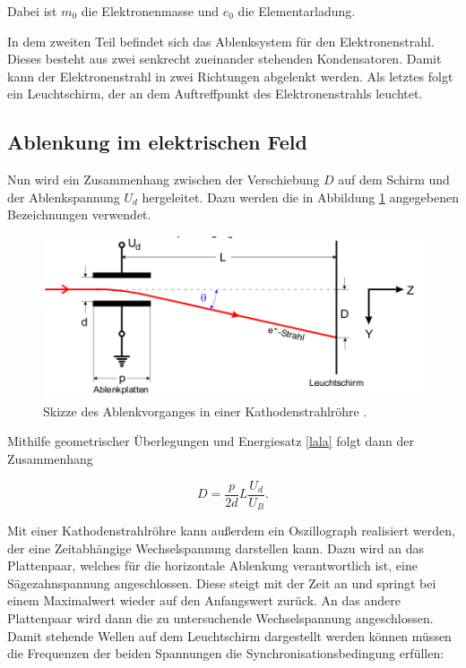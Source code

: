 Dabei ist $m_0$ die Elektronenmasse und $e_0$ die Elementarladung.

In dem zweiten Teil befindet sich das Ablenksystem für den Elektronenstrahl. Dieses
besteht aus zwei senkrecht zueinander stehenden Kondensatoren. Damit kann der Elektronenstrahl
in zwei Richtungen abgelenkt werden.
Als letztes folgt ein Leuchtschirm, der an dem Auftreffpunkt des Elektronenstrahls
leuchtet.
\subsection{Ablenkung im elektrischen Feld}
Nun wird ein Zusammenhang zwischen der Verschiebung $D$ auf dem Schirm und der
Ablenkspannung $U_d$ hergeleitet. Dazu werden die in Abbildung \ref{abb:2} angegebenen
Bezeichnungen verwendet.

\begin{figure}[H]
  \centering
  \includegraphics[width=\textwidth]{content/Ablenkung.png}
  \caption{Skizze des Ablenkvorganges in einer Kathodenstrahlröhre \cite{1}.}
  \label{abb:2}
\end{figure}

Mithilfe geometrischer Überlegungen und Energiesatz \ref{lala} folgt dann der Zusammenhang

\begin{equation}
  D = \frac{p}{2d} L \frac{U_d}{U_B}.
  \label{eq:1}
\end{equation}

Mit einer Kathodenstrahlröhre kann außerdem ein Oszillograph realisiert werden,
der eine Zeitabhängige Wechselspannung darstellen kann. Dazu wird an das Plattenpaar,
welches für die horizontale Ablenkung verantwortlich ist, eine Sägezahnspannung angeschlossen.
Diese steigt mit der Zeit an und springt bei einem Maximalwert wieder auf den Anfangswert
zurück. An das andere Plattenpaar wird dann die zu untersuchende Wechselspannung angeschlossen.
Damit stehende Wellen auf dem Leuchtschirm dargestellt werden können müssen die
Frequenzen der beiden Spannungen die Synchronisationsbedingung erfüllen:

